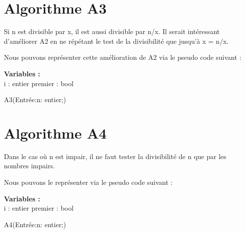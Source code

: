 \section{Algorithme A3}
 Si n est divisible par x, il est aussi divisible par n/x. Il serait intéressant d’améliorer A2 en ne répétant le test de la divisibilité que jusqu’à x = n/x.
 \par
Nous pouvons représenter cette amélioration de A2 via le pseudo code suivant :

\par
\begin{function}[H]
    \textbf{Variables :}\\
    i : entier\;
    premier : bool\;
    \caption{A3(Entrée:n: entier;)}
\end{function}
\newpage

\section{Algorithme A4}
 Dans le cas où n est impair, il ne faut tester la divisibilité de n que par les nombres impairs.
 \par
Nous pouvons le représenter via le pseudo code suivant :

\par
\begin{function}[H]
    \textbf{Variables :}\\
    i : entier\;
    premier : bool\;
    \caption{A4(Entrée:n: entier;)}
\end{function}
\newpage
